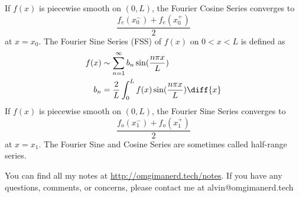 \documentclass{math}
\begin{document}
If \( f(x) \) is piecewise smooth on \( (0,L) \), the Fourier Cosine Series
converges to
\[ \frac{f_e(x_0^-)+f_e(x_0^+)}{2} \]
at \( x = x_0 \). The Fourier Sine Series (FSS) of \( f(x) \) on \( 0<x<L \) is
defined as
\begin{align*}
  f(x) &\sim \sum_{n=1}^{\infty}b_n\sin(\frac{n\pi x}{L}) \\
  b_n &= \frac{2}{L}\int_{0}^{L}f(x)\sin(\frac{n\pi x}{L})\diff{x}
\end{align*}
If \( f(x) \) is piecewise smooth on \( (0,L) \), the Fourier Sine Series
converges to
\[ \frac{f_o(x_1^-)+f_o(x_1^+)}{2} \]
at \( x = x_1 \). The Fourier Sine and Cosine Series are sometimes called
half-range series.

\begin{center}
  You can find all my notes at \url{http://omgimanerd.tech/notes}. If you have
  any questions, comments, or concerns, please contact me at
  alvin@omgimanerd.tech
\end{center}
\end{document}
